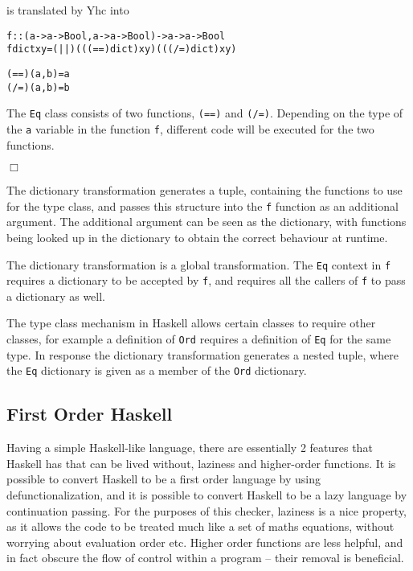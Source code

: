 \documentclass[preprint]{sigplanconf}
\newcommand{\T}[1]{\texttt{#1}}
\newcommand{\noexample}{\hfill$\Box$}
\newenvironment{code}{\begin{alltt}\small}{\end{alltt}}
\begin{document}
is translated by Yhc into

\begin{code}
 f :: (a -> a -> Bool, a -> a -> Bool) -> a -> a -> Bool
 f dict x y = (||) (((==) dict) x y) (((/=) dict) x y)

 (==) (a,b) = a
 (/=) (a,b) = b
\end{code}

The \T{Eq} class consists of two functions, \T{(==)} and \T{(/=)}. Depending on
the type of the \T{a} variable in the function \T{f}, different code will be
executed for the two functions.

\noexample



The dictionary transformation generates a tuple, containing the functions to
use for the type class, and passes this structure into the \T{f} function as an
additional argument. The additional argument can be seen as the dictionary,
with functions being looked up in the dictionary to obtain the correct
behaviour at runtime.

The dictionary transformation is a global transformation. The \T{Eq} context in
\T{f} requires a dictionary to be accepted by \T{f}, and requires all the
callers of \T{f} to pass a dictionary as well.

The type class mechanism in Haskell allows certain classes to require other
classes, for example a definition of \T{Ord} requires a definition of \T{Eq}
for the same type. In response the dictionary transformation generates a nested
tuple, where the \T{Eq} dictionary is given as a member of the \T{Ord}
dictionary.

\subsection{First Order Haskell}

Having a simple Haskell-like language, there are essentially 2 features that
Haskell has that can be lived without, laziness and higher-order functions. It
is possible to convert Haskell to be a first order language by using
defunctionalization, and it is possible to convert Haskell to be a lazy
language by continuation passing. For the purposes of this checker, laziness is
a nice property, as it allows the code to be treated much like a set of maths
equations, without worrying about evaluation order etc. Higher order functions
are less helpful, and in fact obscure the flow of control within a program --
their removal is beneficial.
\end{document}
